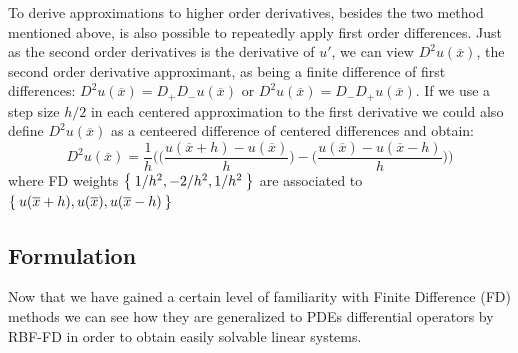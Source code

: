 To derive approximations to higher order derivatives, besides the two method mentioned above, is also possible to repeatedly apply first order differences. Just as the second order derivatives is the derivative of $u'$, we can view $D^2u(\overline{x})$, the second order derivative approximant, as being a finite difference of first differences: $D^2 u(\overline{x}) = D_+ D_- u(\overline{x})$ or $D^2 u(\overline{x}) = D_- D_+ u(\overline{x})$. If we use a step size $h/2$ in each centered approximation to the first derivative we could also define $D^2 u(\overline{x})$ as a centeered difference of centered differences and obtain:
\begin{equation}
	D^2 u(\overline{x}) = \frac{1}{h} \Biggl( \biggl( \frac{u(\overline{x}+h) - u(\overline{x})}{h} \biggr) - \biggl( \frac{u(\overline{x}) - u(\overline{x}-h)}{h} \biggr) \Biggr)
\end{equation}
where FD weights $\Set{1/h^2, -2/h^2, 1/h^2}$ are associated to $\Set{u(\overline{x}+h), u(\overline{x}), u(\overline{x}-h)}$



\subsection{Formulation}
\label{subsec:RBF-FD_formulation}

Now that we have gained a certain level of familiarity with Finite Difference  (FD) methods we can see how they are generalized to PDEs differential operators by RBF-FD in order to obtain easily solvable linear systems.

